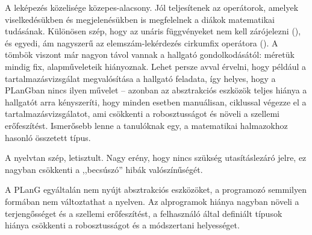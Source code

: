A leképezés közelisége közepes-alacsony.
Jól teljesítenek az operátorok, amelyek viselkedésükben és megjelenésükben is megfelelnek a diákok matematikai tudásának.
Különösen szép, hogy az unáris függvényeket nem kell zárójelezni (), és egyedi, ám nagyszerű az elemszám-lekérdezés cirkumfix operátora ().
A tömbök viszont már nagyon távol vannak a hallgató gondolkodásától: méretük mindig fix, alapműveleteik hiányoznak.
Lehet persze avval érvelni, hogy például a tartalmazásvizsgálat megvalósítása a hallgató feladata, így helyes, hogy a PLanGban nincs ilyen művelet -- azonban az absztrakciós eszközök teljes hiánya a hallgatót arra kényszeríti, hogy minden esetben manuálisan, ciklussal végezze el a tartalmazásvizsgálatot, ami csökkenti a robosztusságot és növeli a szellemi erőfeszítést.
Ismerősebb lenne a tanulóknak egy, a matematikai halmazokhoz hasonló összetett típus.

A nyelvtan szép, letisztult. Nagy erény, hogy nincs szükség utasításlezáró jelre, ez nagyban csökkenti a ,,becsúszó'' hibák valószínűségét.

A PLanG egyáltalán nem nyújt absztrakciós eszközöket, a programozó semmilyen formában nem változtathat a nyelven.
Az alprogramok hiánya nagyban növeli a terjengősséget és a szellemi erőfeszítést, a felhasználó által definiált típusok hiánya csökkenti a robosztusságot és a módszertani helyességet.









